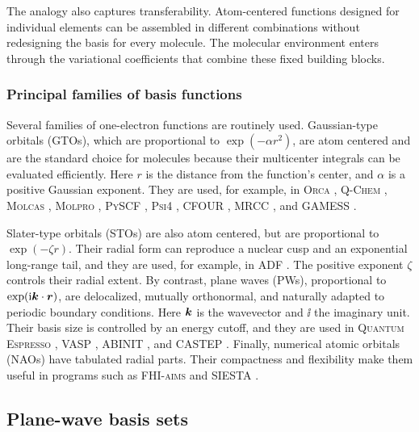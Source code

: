 The analogy also captures transferability. Atom-centered functions designed
for individual elements can be assembled in different combinations without
redesigning the basis for every molecule. The molecular environment enters
through the variational coefficients that combine these fixed building blocks.

\subsubsection{Principal families of basis functions}

Several families of one-electron functions are routinely used.
Gaussian-type orbitals (GTOs), which are proportional to
$\exp(-\alpha r^2)$, are atom centered and are the standard choice for
molecules because their multicenter integrals can be evaluated efficiently.
Here $r$ is the distance from the function's center, and $\alpha$ is a
positive Gaussian exponent.
They are used, for example, in \textsc{Orca} \citep{ORCA2022},
\textsc{Q-Chem} \citep{QChem2021}, \textsc{Molcas} \citep{Molcas2016},
\textsc{Molpro} \citep{Molpro2020}, \textsc{PySCF} \citep{PySCF2020},
\textsc{Psi4} \citep{Psi42020}, \textsc{CFOUR} \citep{CFOUR2020},
\textsc{MRCC} \citep{MRCC2020}, and \textsc{GAMESS} \citep{GAMESS1993}.

Slater-type orbitals (STOs) are also atom centered, but are
proportional to $\exp(-\zeta r)$. Their radial form can reproduce a nuclear
cusp and an exponential long-range tail, and they are used, for example, in
\textsc{ADF} \citep{ADF2001}. The positive exponent $\zeta$ controls their radial extent.
By contrast,
plane waves (PWs), proportional to $\exp(\mathrm{i}\boldsymbol{k}\cdot\boldsymbol{r})$, are
delocalized, mutually orthonormal, and naturally adapted to periodic boundary
conditions. Here $\boldsymbol{k}$ is the wavevector and $\ii$ the imaginary unit.
Their basis size is controlled by an energy cutoff, and they are
used in \textsc{Quantum Espresso} \citep{QuantumEspresso2009},
\textsc{VASP} \citep{VASP1996}, \textsc{ABINIT} \citep{ABINIT2020}, and
\textsc{CASTEP} \citep{CASTEP2005}. Finally, numerical atomic orbitals (NAOs) have
tabulated radial parts. Their compactness and flexibility make them useful in
programs such as \textsc{FHI-aims} \citep{FHIAims2009} and
\textsc{SIESTA} \citep{SIESTA2002}.

\subsection{Plane-wave basis sets}

